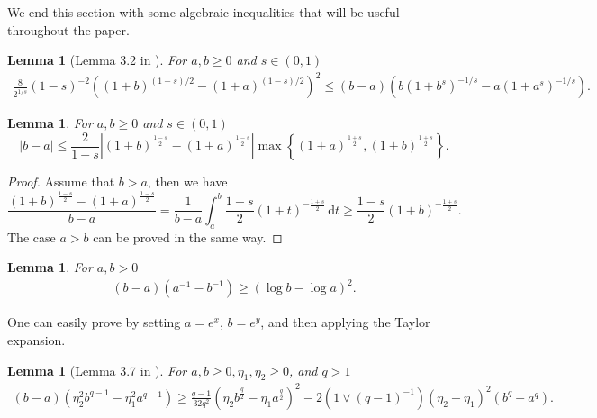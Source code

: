 \documentclass[reqno]{amsart}
\theoremstyle{plain}
\newtheorem{lemma}[theorem]{Lemma}
\theoremstyle{definition}
\numberwithin{equation}{section}
\newcommand{\dt} {\, \mathrm{d}t}
\begin{document}
We end this section with some algebraic inequalities that will be useful throughout the paper.

\begin{lemma} [Lemma 3.2 in \cite{KaSt02}] \label{lem:inequality1}
For $a, b \geq 0$ and $s \in (0,1)$
\begin{align*}
\frac{8}{2^{1/s}} (1-s)^{-2} ((1+b)^{(1-s)/2} - (1+a)^{(1-s)/2})^2 \leq (b-a) (b(1+b^s)^{-1/s} - a(1+a^s)^{-1/s}).
\end{align*}
\end{lemma}

\begin{lemma} \label{lem:inequality1-lower}
For $a, b \geq 0$ and $s \in (0, 1)$
\begin{equation*}
|b-a| \leq \frac{2}{1-s} \left| (1+b)^{\frac{1-s}{2}} - (1+a)^{\frac{1-s}{2}} \right| \max\left\lbrace (1+a)^{\frac{1+s}{2}}, (1+b)^{\frac{1+s}{2}} \right\rbrace.
\end{equation*}
\end{lemma}

\begin{proof}
Assume that $b > a$, then we have
\begin{equation*}
\frac{(1+b)^{\frac{1-s}{2}}-(1+a)^{\frac{1-s}{2}}}{b-a} = \frac{1}{b-a} \int_a^b \frac{1-s}{2} (1+t)^{-\frac{1+s}{2}} \dt \geq \frac{1-s}{2} (1+b)^{-\frac{1+s}{2}}.
\end{equation*}
The case $a > b$ can be proved in the same way.
\end{proof}

\begin{lemma} \label{lem:inequality2}
For $a, b > 0$ 
\begin{align*}
(b-a)(a^{-1} - b^{-1}) \geq (\log b - \log a)^2.
\end{align*}
\end{lemma}

One can easily prove  by setting $a = e^x$, $b = e^y$, and then applying the Taylor expansion.

\begin{lemma} [Lemma 3.7 in \cite{Kas07}] \label{lem:inequality3}
For $a, b \geq 0, \eta_1, \eta_2 \geq 0$, and $q > 1$
\begin{align*}
(b-a)(\eta_2^2 b^{q-1} - \eta_1^2 a^{q-1})
\geq \frac{q-1}{32q^2} \left( \eta_2 b^\frac{q}{2} - \eta_1 a^\frac{q}{2} \right)^2
- 2(1 \lor (q-1)^{-1}) (\eta_2 - \eta_1)^2 (b^q + a^q).
\end{align*}
\end{lemma}
\end{document}
